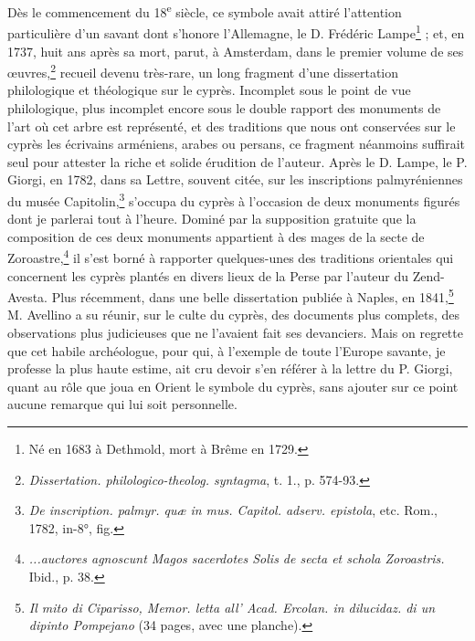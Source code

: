 \documentclass[a4paper, 11pt, oneside, polutonikogreek, french]{article}
\begin{document}
Dès le commencement du 18\textsuperscript{e} siècle, ce symbole avait attiré l'attention particulière d'un savant dont s'honore l'Allemagne, le D. Frédéric Lampe\footnote{Né en 1683 à Dethmold, mort à Brême en 1729.} ; et, en 1737, huit ans après sa mort, parut, à Amsterdam, dans le premier volume de ses œuvres,\footnote{\emph{Dissertation. philologico-theolog. syntagma}, t. 1., p. 574-93.} recueil devenu très-rare, un long fragment d'une dissertation philologique et théologique sur le cyprès. Incomplet sous le point de vue philologique, plus incomplet encore sous le double rapport des monuments de l'art où cet arbre est représenté, et des traditions que nous ont conservées sur le cyprès les écrivains arméniens, arabes ou persans, ce fragment néanmoins suffirait seul pour attester la riche et solide érudition de l'auteur. Après le D. Lampe, le P. Giorgi, en 1782, dans sa Lettre, souvent citée, sur les inscriptions palmyréniennes du musée Capitolin,\footnote{\emph{De inscription. palmyr. quæ in mus. Capitol. adserv. epistola}, etc. Rom., 1782, in-8°, fig.} s'occupa du cyprès à l'occasion de deux monuments figurés dont je parlerai tout à l'heure. Dominé par la supposition gratuite que la composition de ces deux monuments appartient à des mages de la secte de Zoroastre,\footnote{\emph{...auctores agnoscunt Magos sacerdotes Solis de secta et schola Zoroastris.} Ibid., p. 38.} il s'est borné à rapporter quelques-unes des traditions orientales qui concernent les cyprès plantés en divers lieux de la Perse par l'auteur du Zend-Avesta. Plus récemment, dans une belle dissertation publiée à Naples, en 1841,\footnote{\emph{Il mito di Ciparisso, Memor. letta all' Acad. Ercolan. in dilucidaz. di un dipinto Pompejano} (34 pages, avec une planche).} M. Avellino a su réunir, sur le culte du cyprès, des documents plus complets, des observations plus judicieuses que ne l'avaient fait ses devanciers. Mais on regrette que cet habile archéologue, pour qui, à l'exemple de toute l'Europe savante, je professe la plus haute estime, ait cru devoir s'en référer à la lettre du P. Giorgi, quant au rôle que joua en Orient le symbole du cyprès, sans ajouter sur ce point aucune remarque qui lui soit personnelle.
\end{document}
